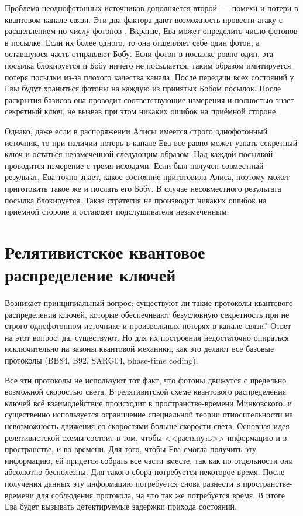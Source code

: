 Проблема неоднофотонных источников дополняется второй~--- помехи и потери в квантовом канале связи. Эти два фактора дают возможность провести атаку с расщеплением по числу фотонов \cite{pns_attack}. Вкратце, Ева может определить число фотонов в посылке. Если их более одного, то она отщепляет себе один фотон, а оставшуюся часть отправляет Бобу. Если фотон в посылке ровно один, эта посылка блокируется и Бобу ничего не посылается, таким образом имитируется потеря посылки из-за плохого качества канала.
После передачи всех состояний у Евы будут храниться фотоны на каждую из принятых Бобом посылок. После раскрытия базисов она проводит соответствующие измерения и полностью знает секретный ключ, не вызвав при этом никаких ошибок на приёмной стороне.

Однако, даже если в распоряжении Алисы имеется строго однофотонный источник, то при наличии потерь в канале Ева все равно может узнать \cite{uds_attack} секретный ключ и остаться незамеченной следующим образом. Над каждой посылкой проводится измерение с тремя исходами. Если был получен совместный результат, Ева точно знает, какое состояние приготовила Алиса, поэтому может приготовить такое же и послать его Бобу. В случае несовместного результата посылка блокируется. Такая стратегия не производит никаких ошибок на приёмной стороне и оставляет подслушивателя незамеченным.

\section{Релятивистское квантовое распределение ключей}
Возникает принципиальный вопрос: существуют ли такие протоколы квантового распределения ключей, которые обеспечивают безусловную секретность при не строго однофотонном источнике и произвольных потерях в канале связи? Ответ на этот вопрос: да, существуют. Но для их построения недостаточно опираться исключительно на законы квантовой механики, как это делают все базовые протоколы (BB84\cite{bb84}, B92\cite{non_orthogonal_states_discrimination_theorem}, SARG04\cite{sarg04}, phase-time coding\cite{phase_time_protocol}). 

Все эти протоколы не используют тот факт, что фотоны движутся с предельно возможной скоростью света. 
В релятивитской схеме квантового распределения ключей всё взаимодействие происходит в пространстве-времени Минковского, и существенно используется ограничение специальной теории относительности на невозможность движения со скоростями больше скорости света. Основная идея релятивистской схемы состоит в том, чтобы <<растянуть>> информацию и в пространстве, и во времени. Для того, чтобы Ева смогла получить эту информацию, ей придется собрать все части вместе, так как по отдельности они абсолютно бесполезны. Для такого сбора потребуется некоторое время. После получения данных эту информацию потребуется снова разнести в пространстве-времени для соблюдения протокола, на что так же потребуется время. В итоге Ева будет вызывать детектируемые задержки прихода состояний.

